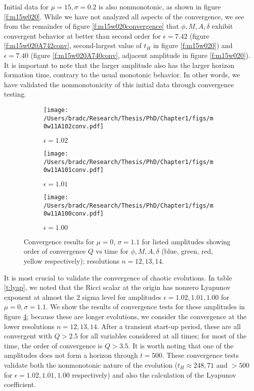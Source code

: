 \documentclass[../PhD.tex]{subfiles}
\begin{document}
\begin{subappendices}
Initial data for $\mu=15,\sigma=0.2$ is also nonmonotonic, as shown in 
figure \ref{f:m15w020}.  While we have not analyzed all aspects of the 
convergence, we see from the remainder of figure \ref{f:m15w020convergence}
that $\phi,M,A,\delta$ exhibit convergent behavior at better than
second order for $\epsilon=7.42$
(figure \ref{f:m15w020A742conv}, second-largest value of $t_H$ in 
figure \ref{f:m15w020}) and $\epsilon=7.40$ (figure \ref{f:m15w020A740conv},
adjacent amplitude in figure \ref{f:m15w020}).  It is important to note that
the larger amplitude also has the larger horizon formation time, contrary
to the usual monotonic behavior.  In other words, we have validated the
nonmonotonicity of this initial data through convergence testing.

\begin{figure}[!t]
\centering
\begin{subfigure}[t]{0.31\textwidth}
\texttt{[image: /Users/bradc/Research/Thesis/PhD/Chapter1/figs/m0w11A102conv.pdf]}
\caption{$\epsilon=1.02$}
\label{f:m0w11A102conv}
\end{subfigure}
\begin{subfigure}[t]{0.31\textwidth}
\texttt{[image: /Users/bradc/Research/Thesis/PhD/Chapter1/figs/m0w11A101conv.pdf]}
\caption{$\epsilon=1.01$}
\label{f:m0w11A101conv}
\end{subfigure}
\begin{subfigure}[t]{0.31\textwidth}
\texttt{[image: /Users/bradc/Research/Thesis/PhD/Chapter1/figs/m0w11A100conv.pdf]}
\caption{$\epsilon=1.00$}
\label{f:m0w11A100conv}
\end{subfigure}
\caption[Order of convergence for $\phi$, $M$, $A$, $\delta$ as a function of time for $\mu = 0$ at nearby amplitudes]{Convergence results for $\mu=0$, $\sigma=1.1$ for listed amplitudes
showing order of convergence $Q$ vs time for $\phi,M,A,\delta$ 
(blue, green, red, yellow respectively); resolutions $n=12,13,14$.
}
\label{f:m0w11convergence}
\end{figure}

It is most crucial to validate the convergence of chaotic evolutions.
In table \ref{t:lyap}, we noted that the Ricci scalar at the origin has
nonzero Lyapunov exponent at almost the 2 sigma level for amplitudes
$\epsilon=1.02,1.01,1.00$ for $\mu=0,\sigma=1.1$.  We show the results of
convergence tests for these amplitudes in figure \ref{f:m0w11convergence};
because these are longer evolutions, we consider the convergence at the lower
resolutions $n=12,13,14$.  After a transient start-up period, these are all
convergent with $Q>2.5$ for all variables considered at all times; for most
of the time, the order of convergence is $Q>3.5$.  It is worth noting that
one of the amplitudes does not form a horizon through $t=500$.  
These convergence tests validate both the nonmonotonic nature of the
evolution ($t_H\approx 248,71$ and $>500$ for $\epsilon=1.02,1.01,1.00$
respectively) and also the calculation of the Lyapunov coefficient.


\end{subappendices}
\end{document}
